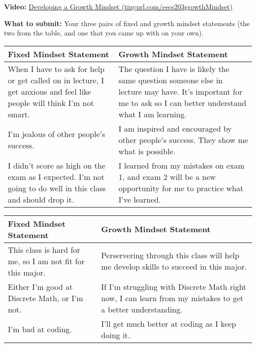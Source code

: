 \documentclass[12pt]{exam}
\begin{document}
\textbf{Video:} \href{https://tinyurl.com/eecs203growthMindset}{Developing a Growth Mindset (tinyurl.com/eecs203growthMindset)}

\textbf{What to submit:} Your three pairs of fixed and growth mindset statements 
(the two from the table, and one that you came up with on your own).

\begin{center}
\begin{tabular}{ |p{18em}|p{18em}| } 
\hline
\textbf{Fixed Mindset Statement} & \textbf{Growth Mindset Statement}\\
\hline

When I have to ask for help or get called on in lecture, I get anxious and feel like people will think I’m not smart.

& The question I have is likely the same question someone else in lecture may have. It’s important for me to ask so I can better understand what I am learning.
\\ \hline

I’m jealous of other people’s success.

& I am inspired and encouraged by other people’s success. They show me what is possible.
\\ \hline

I didn’t score as high on the exam as I expected. I’m not going to do well in this class and should drop it.

& I learned from my mistakes on exam 1, and exam 2 will be a new opportunity for me to practice what I’ve learned.
\\ \hline
\end{tabular}
\end{center}

\begin{solution}
  \begin{center}
    \begin{tabular}{ |p{18em}|p{18em}| } 
    \hline
    \textbf{Fixed Mindset Statement} & \textbf{Growth Mindset Statement}\\
    \hline
    
    This class is hard for me, so I am not fit for this major.
    & Perservering through this class will help me develop skills to succeed in this major.
    \\ \hline
    
    Either I'm good at Discrete Math, or I'm not. 
    & If I'm struggling with Discrete Math right now, I can learn from my mistakes to get a better understanding.
    \\ \hline
    
    I'm bad at coding. & I'll get much better at coding as I keep doing it. \\ 
    \hline
    \end{tabular}
    \end{center}
\end{solution}
\end{document}
